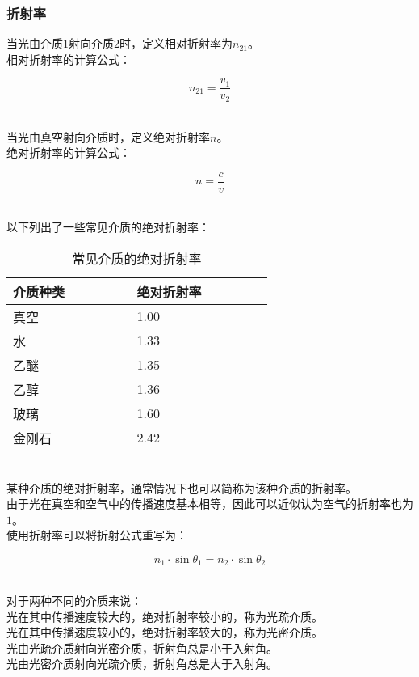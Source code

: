 \documentclass[UTF8]{ctexart}
\begin{document}
\subsubsection{折射率}
    当光由介质$1$射向介质$2$时，定义相对折射率为$n_{21}$。\\[3mm]
    相对折射率的计算公式：
    \begin{large}
        \begin{equation*}
            n_{21}=\frac{v_1}{v_2}
        \end{equation*}
    \end{large}\\
    当光由真空射向介质时，定义绝对折射率$n$。\\[3mm]
    绝对折射率的计算公式：
    \begin{large}
        \begin{equation*}
            n=\frac{c}{v}
        \end{equation*}
    \end{large}\\
    以下列出了一些常见介质的绝对折射率：\vspace{5pt}
    \begin{table}[h]
        \begin{center}
            \begin{tabular}{l|l}
                \hline
                介质种类~~~~~~~~&绝对折射率~~~~~~~~\\ \hline
                真空&1.00\\ \hline
                水&1.33\\ \hline
                乙醚&1.35\\ \hline
                乙醇&1.36\\ \hline
                玻璃&1.60\\ \hline
                金刚石&2.42\\ \hline
            \end{tabular}
            \caption{常见介质的绝对折射率}
        \end{center}
    \end{table}\\
    某种介质的绝对折射率，通常情况下也可以简称为该种介质的折射率。\\[3mm]
    由于光在真空和空气中的传播速度基本相等，因此可以近似认为空气的折射率也为$1$。\\[6mm]
    使用折射率可以将折射公式重写为：
    \begin{large}
        \begin{equation*}
            n_1\cdot\sin{\theta_1}=n_2\cdot\sin{\theta_2}
        \end{equation*}
    \end{large}\\
    对于两种不同的介质来说：\\[3mm]
    光在其中传播速度较大的，绝对折射率较小的，称为光疏介质。\\[3mm]
    光在其中传播速度较小的，绝对折射率较大的，称为光密介质。\\[3mm]
    光由光疏介质射向光密介质，折射角总是小于入射角。\\[3mm]
    光由光密介质射向光疏介质，折射角总是大于入射角。
\end{document}
